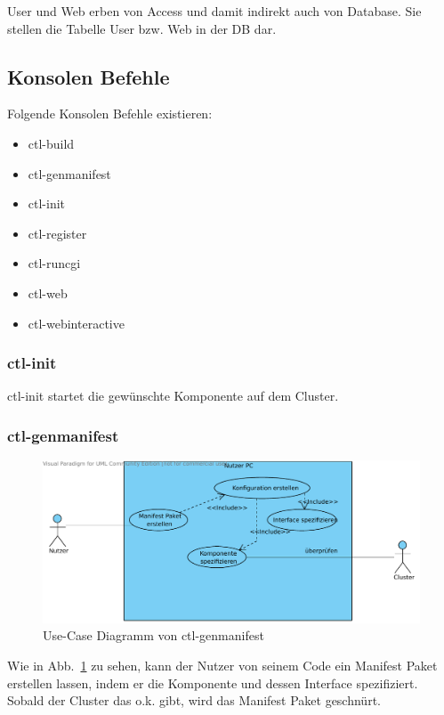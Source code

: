 User und Web erben von Access und damit indirekt auch von Database.
Sie stellen die Tabelle User bzw. Web in der DB dar.

\subsection{Konsolen Befehle}
Folgende Konsolen Befehle existieren:
\begin{itemize}
  \item ctl-build
  \item ctl-genmanifest
  \item ctl-init
  \item ctl-register
  \item ctl-runcgi
  \item ctl-web
  \item ctl-webinteractive
\end{itemize}

\subsubsection{ctl-init}
ctl-init startet die gewünschte Komponente auf dem Cluster.

\subsubsection{ctl-genmanifest}
\begin{figure}[H]
  \begin{center}
	\includegraphics[scale=0.7]{bilder/ctl-genmanifest_usecase.pdf}
	\caption{Use-Case Diagramm von ctl-genmanifest}
	\label{g_ctl-genmanifest_uc}
  \end{center}
\end{figure}
Wie in Abb.\ \ref{g_ctl-genmanifest_uc} zu sehen, kann der Nutzer von seinem
Code ein Manifest Paket erstellen lassen, indem er die Komponente und dessen
Interface spezifiziert. Sobald der Cluster das o.k. gibt, wird das Manifest
Paket geschnürt.


